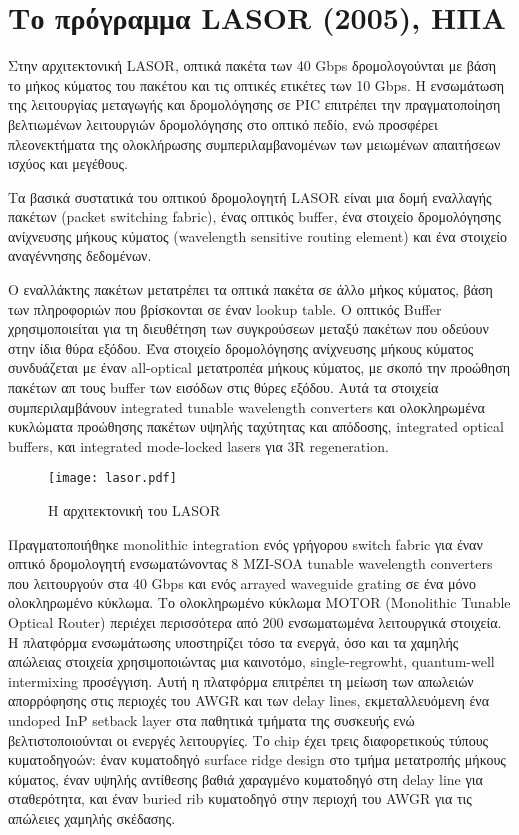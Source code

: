 
\section{Το πρόγραμμα LASOR (2005), ΗΠΑ}

Στην αρχιτεκτονική LASOR, οπτικά πακέτα των 40 Gbps δρομολογούνται με
βάση το μήκος κύματος του πακέτου και τις οπτικές ετικέτες των 10
Gbps. Η ενσωμάτωση της λειτουργίας μεταγωγής και δρομολόγησης σε PIC
επιτρέπει την πραγματοποίηση βελτιωμένων λειτουργιών δρομολόγησης στο
οπτικό πεδίο, ενώ προσφέρει πλεονεκτήματα της ολοκλήρωσης
συμπεριλαμβανομένων των μειωμένων απαιτήσεων ισχύος και μεγέθους.

Τα βασικά συστατικά του οπτικού δρομολογητή LASΟR \cite{1584172} είναι
μια δομή εναλλαγής πακέτων (packet switching fabric), ένας οπτικός
buffer, ένα στοιχείο δρομολόγησης ανίχνευσης μήκους κύματος
(wavelength sensitive routing element) και ένα στοιχείο αναγέννησης
δεδομένων.

Ο εναλλάκτης πακέτων μετατρέπει τα οπτικά πακέτα σε άλλο μήκος
κύματος, βάση των πληροφοριών που βρίσκονται σε έναν lookup table. Ο
οπτικός Buffer χρησιμοποιείται για τη διευθέτηση των συγκρούσεων
μεταξύ πακέτων που οδεύουν στην ίδια θύρα εξόδου. Ένα στοιχείο
δρομολόγησης ανίχνευσης μήκους κύματος συνδυάζεται με έναν all-optical
μετατροπέα μήκους κύματος, με σκοπό την προώθηση πακέτων απ τους
buffer των εισόδων στις θύρες εξόδου. Αυτά τα στοιχεία
συμπεριλαμβάνουν integrated tunable wavelength converters και
ολοκληρωμένα κυκλώματα προώθησης πακέτων υψηλής ταχύτητας και
απόδοσης, integrated optical buffers, και integrated mode-locked
lasers για 3R regeneration.

\begin{figure}[h]
  \centering
  \texttt{[image: lasor.pdf]}
  \caption{Η αρχιτεκτονική του LASOR}
  \label{fig:lasor}
\end{figure}

Πραγματοποιήθηκε monolithic integration ενός γρήγορου switch fabric
για έναν οπτικό δρομολογητή ενσωματώνοντας 8 MZI-SOA tunable
wavelength converters που λειτουργούν στα 40 Gbps και ενός arrayed
waveguide grating σε ένα μόνο ολοκληρωμένο κύκλωμα. \cite{5515982} Το
ολοκληρωμένο κύκλωμα MOTOR (Monolithic Tunable Optical Router)
περιέχει περισσότερα από 200 ενσωματωμένα λειτουργικά στοιχεία. Η
πλατφόρμα ενσωμάτωσης υποστηρίζει τόσο τα ενεργά, όσο και τα χαμηλής
απώλειας στοιχεία χρησιμοποιώντας μια καινοτόμο, single-regrowht,
quantum-well intermixing προσέγγιση. Αυτή η πλατφόρμα επιτρέπει τη
μείωση των απωλειών απορρόφησης στις περιοχές του AWGR και των delay
lines, εκμεταλλευόμενη ένα undoped InP setback layer στα παθητικά
τμήματα της συσκευής ενώ βελτιστοποιούνται οι ενεργές λειτουργίες.  Το
chip έχει τρεις διαφορετικούς τύπους κυματοδηγοών: έναν κυματοδηγό
surface ridge design στο τμήμα μετατροπής μήκους κύματος, έναν υψηλής
αντίθεσης βαθιά χαραγμένο κυματοδηγό στη delay line για σταθερότητα,
και έναν buried rib κυματοδηγό στην περιοχή του AWGR για τις απώλειες
χαμηλής σκέδασης.

